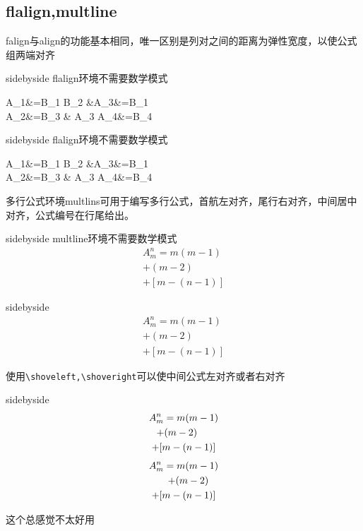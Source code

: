 \documentclass[cn,chinese,color=cyan]{elegantbook}
\begin{document}
\subsection{flalign,multline}
falign与align的功能基本相同，唯一区别是列对之间的距离为弹性宽度，以使公式组两端对齐
\begin{tcblisting}{sidebyside}
flalign环境不需要数学模式
\begin{flalign}{3}
A_{1}&=B_{1} B_{2}  &A_{3}&=B_{1} \\ 
A_{2}&=B_{3} & A_{3} A_{4}&=B_{4}
\end{flalign}
\end{tcblisting}
\begin{tcblisting}{sidebyside}
flalign环境不需要数学模式
\begin{flalign*}{3}
A_{1}&=B_{1} B_{2}  &A_{3}&=B_{1} \\ 
A_{2}&=B_{3} & A_{3} A_{4}&=B_{4}
\end{flalign*}
\end{tcblisting}
多行公式环境multlins可用于编写多行公式，首航左对齐，尾行右对齐，中间居中对齐，公式编号在行尾给出。
\begin{tcblisting}{sidebyside}
multline环境不需要数学模式
\begin{multline} A_{m}^{n}=m(m-1) \\
+(m-2) 
\\+[m-(n-1)] 
\end{multline}
\end{tcblisting}
\begin{tcblisting}{sidebyside}
\begin{multline*} A_{m}^{n}=m(m-1) \\
+(m-2) 
\\+[m-(n-1)] 
\end{multline*}
\end{tcblisting}
使用\verb|\shoveleft,\shoveright|可以使中间公式左对齐或者右对齐
\begin{tcblisting}{sidebyside}
\begin{multline} A_{m}^{n}=m(m-1) \\
\shoveleft{+(m-2)} \\
+[m-(n-1)] 
\end{multline}
\begin{multline*} A_{m}^{n}=m(m-1) \\
\shoveright{+(m-2)} \\
+[m-(n-1)] 
\end{multline*}
\end{tcblisting}
\begin{note}
	这个总感觉不太好用
\end{note}
\end{document}
